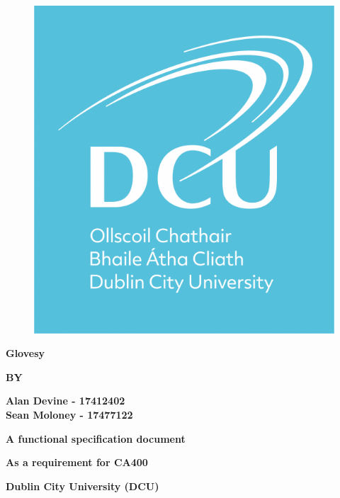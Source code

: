 \documentclass[12pt,a4paper,oneside]{book}
\theoremstyle{plain}
\numberwithin{equation}{chapter}
\begin{document}
\thispagestyle{empty}

\begin{figure}[h!]
\vskip1in
\begin{center}
\includegraphics[width = 3.5 cm]{res/DCU_logo_square.png}
\end{center}
\end{figure}

\begin{center}
\large\textbf{Glovesy}
\end{center}

\vskip2.5cm

\begin{center}
\textbf{BY}
\end{center}

\vskip0.6cm

\begin{center}
\textbf{Alan Devine - 17412402}\\
\textbf{Sean Moloney - 17477122}
\end{center}

\vskip3.5cm

\begin{center}
\textbf{A functional specification document}
\end{center}

\begin{center}
\textbf{As a requirement for CA400}
\end{center}
\vskip2cm
\begin{center}
\textbf{Dublin City University (DCU)}
\end{center}
\end{document}
